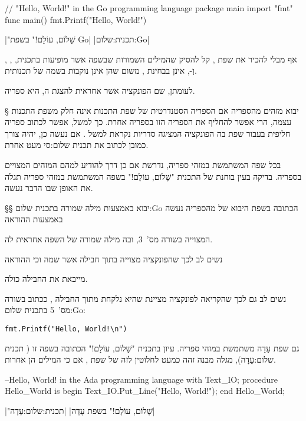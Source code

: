 \begin{תכנית}
\begin{GOn}
// "Hello, World!" in the Go programming language
package main
import "fmt"
func main() {
  fmt.Printf("Hello, World!\n")
}
\end{GOn}
|"שָׁלוֹם, עוֹלָם!" בשפת Go|
|תכנית:שלום:Go|
\end{תכנית}

אף מבלי להכיר את שפת , קל להסיק שהמילים השמורות שבשפה אשר מופיעות
בתכנית, , , וְ-, אינן בבחינת , משום שהן
אינן נוקבות בשמה של  תכנותית.

לעומתן, שם הפונקציה  אשר אחראית להצגת ה, היא  ספריה.

§ יבוא מזהים מהספריה
אם הספריה הסטנדרטית של שפת התכנות אינה חלק משפת התכנות עצמה, הרי אפשר להחליף
את הספריה הזו בספריה אחרת. כך למשל, אפשר לכתוב ספריה חליפית בעבור שפת  בה
הפונקציה המציגה סדריות נקראת למשל . אם נעשה כן, יהיה צורך כמובן
לכתוב את  תכנית שלום:סי מעט אחרת.

בכל שפה המשתמשת במזהי ספריה, נדרשת אם כן דרך להודיע ל מהם המזהים המצויים
בספריה. בדיקה בעין בוחנת של התכנית "שָׁלוֹם, עוֹלָם!" בשפה המשתמשת במזהי ספריה תגלה
את האופן שבו הדבר נעשה.

§§ יבוא באמצעות מילה שמורה
ב תכנית שלום:Go הכתובה בשפת \Go היבוא של  מהספריה נעשה באמצעות ההוראה
\begin{קוד}
\end{קוד}
המצוייה בשורה מס'~3, ובה מילה שמורה של השפה אחראית ל ה.

נשים לב לכך שהפונקציה  מצוייה בתוך חבילה אשר שמה  וכי
ההוראה
\begin{קוד}
\end{קוד}
מייבאת את החבילה כולה.

נשים לב גם לכך שהקריאה לפונקציה  מציינת שהיא נלקחת מתוך
החבילה , ככתוב בשורה מס'~5 ב תכנית שלום:Go{:}
\begin{קוד}
\lstset{language=Golang}
\lstinline+fmt.Printf("Hello, World!\n")+
\end{קוד}

גם שפת עָדָה משתמשת במזהי ספריה. עיון בתכנית "שָׁלוֹם, עוֹלָם!" הכתובה בשפה זו (
תכנית שלום:עָדָה), מגלה מבנה זהה כמעט לחלוטין לזה של שפת \Go, אם כי המילים הן
אחרות.

\begin{תכנית}

\begin{ADAn}
--Hello, World! in the Ada programming language
  with Text_IO;
  procedure Hello_World is
  begin
  Text_IO.Put_Line("Hello, World!");
  end Hello_World;
\end{ADAn}
|"שָׁלוֹם, עוֹלָם!" בשפת עָדָה|
|תכנית:שלום:עָדָה|
\end{תכנית}

